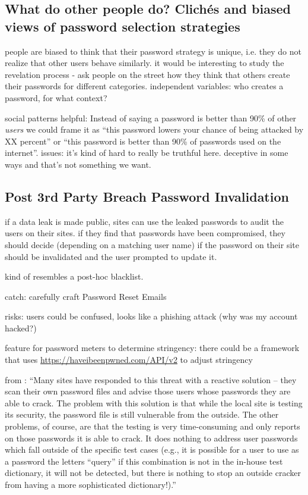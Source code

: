 \subsection{What do other people do? Clichés and biased views of password selection strategies}
people are biased to think that their password strategy is unique, i.e. they do not realize that other users behave similarly. it would be interesting to study the revelation process - ask people on the street how they think that others create their passwords for different categories. independent variables: who creates a password, for what context?

social patterns helpful: Instead of saying a password is better than 90\% of other \textit{users} we could frame it as ``this password lowers your chance of being attacked by XX percent'' or ``this password is better than 90\% of passwords used on the internet''. issues: it's kind of hard to really be truthful here. deceptive in some ways and that's not something we want. 

\subsection{Post 3rd Party Breach Password Invalidation}
if a data leak is made public, sites can use the leaked passwords to audit the users on their sites. if they find that passwords have been compromised, they should decide (depending on a matching user name) if the password on their site should be invalidated and the user prompted to update it.

kind of resembles a post-hoc blacklist.  

catch: carefully craft Password Reset Emails \cite{Kim2017TooBusy}

risks: users could be confused, looks like a phishing attack (why was my account hacked?)

feature for password meters to determine stringency: 
there could be a framework that uses \url{https://haveibeenpwned.com/API/v2} to adjust stringency 

from \cite{Bishop1995ProactivePasswordChecking}: ``Many sites have responded to this threat with a reactive solution -- they scan their own password files and advise those users whose passwords they are able to crack. The problem with this solution is that while the local site is testing its security, the password file is still vulnerable from the outside. The other problems, of course, are that the testing is very time-consuming and only reports on those passwords it is able to crack. It does nothing to address user passwords which fall outside of the specific test cases (e.g., it is possible for a user to use as a password the letters ``query'' if this combination is not in the in-house test dictionary, it will not be detected, but there is nothing to stop an outside cracker from having a more sophisticated dictionary!).''

